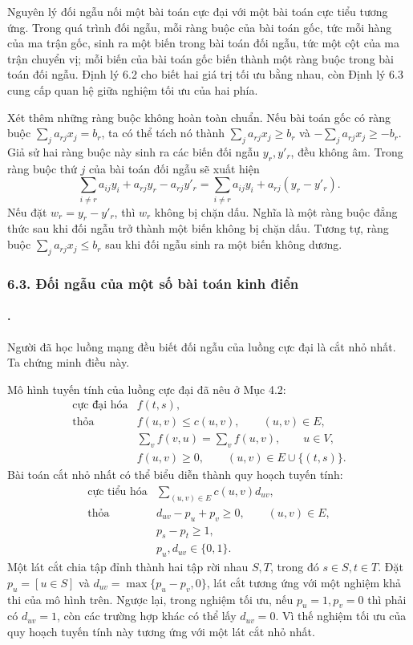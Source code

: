 \documentclass[11pt]{article}
\begin{document}
Nguyên lý đối ngẫu nối một bài toán cực đại với một bài toán cực tiểu tương
ứng. Trong quá trình đối ngẫu, mỗi ràng buộc của bài toán gốc, tức mỗi hàng
của ma trận gốc, sinh ra một biến trong bài toán đối ngẫu, tức một cột của ma
trận chuyển vị; mỗi biến của bài toán gốc biến thành một ràng buộc trong bài
toán đối ngẫu. Định lý 6.2 cho biết hai giá trị tối ưu bằng nhau, còn Định lý
6.3 cung cấp quan hệ giữa nghiệm tối ưu của hai phía.

Xét thêm những ràng buộc không hoàn toàn chuẩn. Nếu bài toán gốc có ràng buộc
\(\sum_j a_{rj}x_j=b_r\), ta có thể tách nó thành
\(\sum_j a_{rj}x_j\ge b_r\) và \(-\sum_j a_{rj}x_j\ge -b_r\). Giả sử hai
ràng buộc này sinh ra các biến đối ngẫu \(y_r,y'_r\), đều không âm. Trong
ràng buộc thứ \(j\) của bài toán đối ngẫu sẽ xuất hiện
\[
  \sum_{i\ne r}a_{ij}y_i+a_{rj}y_r-a_{rj}y'_r
  =
  \sum_{i\ne r}a_{ij}y_i+a_{rj}(y_r-y'_r).
\]
Nếu đặt \(w_r=y_r-y'_r\), thì \(w_r\) không bị chặn dấu. Nghĩa là một ràng
buộc đẳng thức sau khi đối ngẫu trở thành một biến không bị chặn dấu. Tương
tự, ràng buộc \(\sum_j a_{rj}x_j\le b_r\) sau khi đối ngẫu sinh ra một biến
không dương.

\subsubsection*{6.3. Đối ngẫu của một số bài toán kinh điển}

\paragraph{.}
Người đã học luồng mạng đều biết đối ngẫu của luồng cực đại là cắt nhỏ nhất.
Ta chứng minh điều này.

Mô hình tuyến tính của luồng cực đại đã nêu ở Mục 4.2:
\[
\begin{array}{ll}
\text{cực đại hóa} & f(t,s),\\
\text{thỏa} & f(u,v)\le c(u,v),\qquad (u,v)\in E,\\
& \displaystyle \sum_v f(v,u)=\sum_v f(u,v),\qquad u\in V,\\
& f(u,v)\ge 0,\qquad (u,v)\in E\cup\{(t,s)\}.
\end{array}
\]
Bài toán cắt nhỏ nhất có thể biểu diễn thành quy hoạch tuyến tính:
\[
\begin{array}{ll}
\text{cực tiểu hóa} & \displaystyle \sum_{(u,v)\in E} c(u,v)d_{uv},\\
\text{thỏa} & d_{uv}-p_u+p_v\ge 0,\qquad (u,v)\in E,\\
& p_s-p_t\ge 1,\\
& p_u,d_{uv}\in\{0,1\}.
\end{array}
\]
Một lát cắt chia tập đỉnh thành hai tập rời nhau \(S,T\), trong đó
\(s\in S,t\in T\). Đặt \(p_u=[u\in S]\) và
\(d_{uv}=\max\{p_u-p_v,0\}\), lát cắt tương ứng với một nghiệm khả thi của mô
hình trên. Ngược lại, trong nghiệm tối ưu, nếu \(p_u=1,p_v=0\) thì phải có
\(d_{uv}=1\), còn các trường hợp khác có thể lấy \(d_{uv}=0\). Vì thế nghiệm
tối ưu của quy hoạch tuyến tính này tương ứng với một lát cắt nhỏ nhất.
\end{document}
